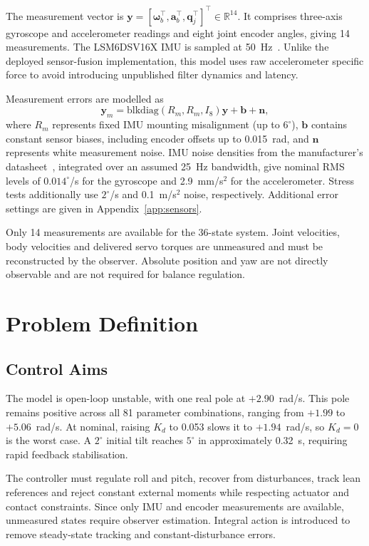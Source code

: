 \documentclass[conference,a4paper]{IEEEtran}
\begin{document}
The measurement vector is $\mathbf{y}=[\boldsymbol\omega_b^\top, \mathbf{a}_b^\top,\mathbf{q}_j^\top]^\top \in\mathbb{R}^{14}$. 
It comprises three-axis gyroscope and accelerometer readings and eight joint encoder angles, giving 14 measurements. The LSM6DSV16X IMU is sampled at 50~Hz~\cite{openmicroduck_params,lsm6dsv16x}. Unlike the deployed sensor-fusion implementation, this model uses raw accelerometer specific force to avoid introducing unpublished filter dynamics and latency.

Measurement errors are modelled as
\[
\mathbf{y}_m=
\mathrm{blkdiag}(R_m,R_m,I_8)\mathbf{y}
+\mathbf{b}+\mathbf{n},
\]
where $R_m$ represents fixed IMU mounting misalignment (up to $6^\circ$), $\mathbf{b}$ contains constant sensor biases, including encoder offsets up to 0.015~rad, and $\mathbf{n}$ represents white measurement noise. IMU noise densities from the manufacturer's datasheet~\cite{lsm6dsv16x}, integrated over an assumed 25~Hz bandwidth, give nominal RMS levels of $0.014^\circ$/s for the gyroscope and 2.9~mm/s$^2$ for the accelerometer. Stress tests additionally use $2^\circ$/s and 0.1~m/s$^2$ noise, respectively. Additional error settings are given in Appendix~\ref{app:sensors}.

Only 14 measurements are available for the 36-state system. Joint velocities, body velocities and delivered servo torques are unmeasured and must be reconstructed by the observer. Absolute position and yaw are not directly observable and are not required for balance regulation.


\section{Problem Definition}

\subsection{Control Aims}
The model is open-loop unstable, with one real pole at $+2.90$~rad/s. This pole remains positive across all 81 parameter combinations, ranging from $+1.99$ to $+5.06$~rad/s. At nominal, raising $K_d$ to 0.053 slows it to $+1.94$~rad/s, so $K_d=0$ is the worst case. A $2^\circ$ initial tilt reaches $5^\circ$ in approximately 0.32~s, requiring rapid feedback stabilisation.

The controller must regulate roll and pitch, recover from disturbances, track lean references and reject constant external moments while respecting actuator and contact constraints. Since only IMU and encoder measurements are available, unmeasured states require observer estimation. Integral action is introduced to remove steady-state tracking and constant-disturbance errors.
\end{document}
